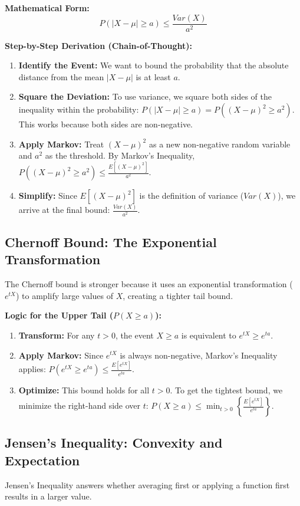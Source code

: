 \documentclass[11pt]{article}
\begin{document}
\textbf{Mathematical Form:}
\[ P(|X - \mu| \ge a) \le \frac{Var(X)}{a^{2}} \]

\textbf{Step-by-Step Derivation (Chain-of-Thought):}
\begin{enumerate}
    \item \textbf{Identify the Event:} We want to bound the probability that the absolute distance from the mean $|X - \mu|$ is at least $a$.
    \item \textbf{Square the Deviation:} To use variance, we square both sides of the inequality within the probability: $P(|X - \mu| \ge a) = P((X - \mu)^{2} \ge a^{2})$. This works because both sides are non-negative.
    \item \textbf{Apply Markov:} Treat $(X - \mu)^{2}$ as a new non-negative random variable and $a^{2}$ as the threshold. By Markov's Inequality, $P((X - \mu)^{2} \ge a^{2}) \le \frac{E[(X - \mu)^{2}]}{a^{2}}$.
    \item \textbf{Simplify:} Since $E[(X - \mu)^{2}]$ is the definition of variance ($Var(X)$), we arrive at the final bound: $\frac{Var(X)}{a^{2}}$.
\end{enumerate}

\subsection{Chernoff Bound: The Exponential Transformation}
The Chernoff bound is stronger because it uses an exponential transformation ($e^{tX}$) to amplify large values of $X$, creating a tighter tail bound.

\textbf{Logic for the Upper Tail ($P(X \ge a)$):}
\begin{enumerate}
    \item \textbf{Transform:} For any $t > 0$, the event $X \ge a$ is equivalent to $e^{tX} \ge e^{ta}$.
    \item \textbf{Apply Markov:} Since $e^{tX}$ is always non-negative, Markov's Inequality applies: $P(e^{tX} \ge e^{ta}) \le \frac{E[e^{tX}]}{e^{ta}}$.
    \item \textbf{Optimize:} This bound holds for all $t > 0$. To get the tightest bound, we minimize the right-hand side over $t$: $P(X \ge a) \le \min_{t>0} \left\{ \frac{E[e^{tX}]}{e^{ta}} \right\}$.
\end{enumerate}

\subsection{Jensen's Inequality: Convexity and Expectation}
Jensen's Inequality answers whether averaging first or applying a function first results in a larger value.
\end{document}
